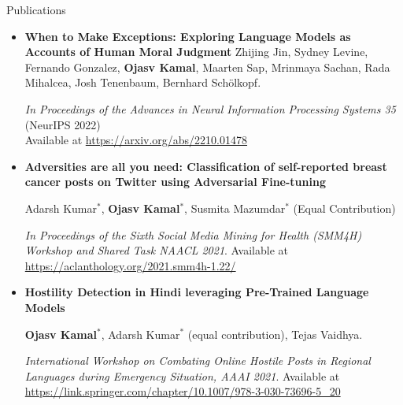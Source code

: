 \documentclass[40]{resume} %
\begin{document}
\begin{rSection}{Publications}
    \vspace{0.3cm}
    \begin{itemize}[leftmargin=0.15in]
       \item \textbf{When to Make Exceptions: Exploring Language Models as Accounts of Human Moral Judgment
       }
       Zhijing Jin, Sydney Levine, Fernando Gonzalez, \textbf{Ojasv Kamal}, Maarten Sap, Mrinmaya Sachan, Rada Mihalcea, Josh Tenenbaum, Bernhard Schölkopf.
       
        \emph{In Proceedings of the Advances in Neural Information Processing Systems 35} (NeurIPS 2022) \\Available at 
        \url{https://arxiv.org/abs/2210.01478}

      \vspace{4pt}
    
       \item \textbf{Adversities are all you need: Classification of self-reported breast cancer posts on Twitter using Adversarial Fine-tuning}
       
       Adarsh Kumar$^*$, \textbf{Ojasv Kamal$^*$}, Susmita Mazumdar$^*$ (Equal Contribution)
       
       \emph{In Proceedings of the Sixth Social Media Mining for Health (SMM4H) Workshop and Shared Task NAACL 2021}. Available at \url{https://aclanthology.org/2021.smm4h-1.22/}
       \vspace{4pt}

       \item \textbf{Hostility Detection in Hindi leveraging Pre-Trained Language Models}
       
       \textbf{Ojasv Kamal$^*$}, Adarsh Kumar$^*$ (equal contribution), Tejas Vaidhya. 
       
       \emph{International Workshop on Combating Online Hostile Posts in Regional Languages during Emergency Situation, AAAI 2021}. Available at \url{https://link.springer.com/chapter/10.1007/978-3-030-73696-5_20}
       

      
    \end{itemize}

    
    \end{rSection}
\end{document}
